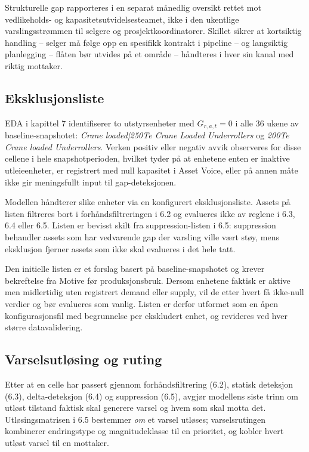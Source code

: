 \documentclass[a4paper,11pt]{article}
\begin{document}
Strukturelle gap rapporteres i en separat månedlig oversikt rettet mot vedlikeholds- og kapasitetsutvidelsesteamet, ikke i den ukentlige varslingsstrømmen til selgere og prosjektkoordinatorer. Skillet sikrer at kortsiktig handling – selger må følge opp en spesifikk kontrakt i pipeline – og langsiktig planlegging – flåten bør utvides på et område – håndteres i hver sin kanal med riktig mottaker.

\subsection{Eksklusjonsliste}

EDA i kapittel 7 identifiserer to utstyrsenheter med $G_{r,a,t} = 0$ i alle 36 ukene av baseline-snapshotet: \textit{Crane loaded|250Te Crane Loaded Underrollers} og \textit{200Te Crane loaded Underrollers}. Verken positiv eller negativ avvik observeres for disse cellene i hele snapshotperioden, hvilket tyder på at enhetene enten er inaktive utleieenheter, er registrert med null kapasitet i Asset Voice, eller på annen måte ikke gir meningsfullt input til gap-deteksjonen.

Modellen håndterer slike enheter via en konfigurert eksklusjonsliste. Assets på listen filtreres bort i forhåndsfiltreringen i 6.2 og evalueres ikke av reglene i 6.3, 6.4 eller 6.5. Listen er bevisst skilt fra suppression-listen i 6.5: suppression behandler assets som har vedvarende gap der varsling ville vært støy, mens eksklusjon fjerner assets som ikke skal evalueres i det hele tatt.

Den initielle listen er et forslag basert på baseline-snapshotet og krever bekreftelse fra Motive før produksjonsbruk. Dersom enhetene faktisk er aktive men midlertidig uten registrert demand eller supply, vil de etter hvert få ikke-null verdier og bør evalueres som vanlig. Listen er derfor utformet som en åpen konfigurasjonsfil med begrunnelse per ekskludert enhet, og revideres ved hver større datavalidering.

\subsection{Varselsutløsing og ruting}

Etter at en celle har passert gjennom forhåndsfiltrering (6.2), statisk deteksjon (6.3), delta-deteksjon (6.4) og suppression (6.5), avgjør modellens siste trinn om utløst tilstand faktisk skal generere varsel og hvem som skal motta det. Utløsingsmatrisen i 6.5 bestemmer \textit{om} et varsel utløses; varselsrutingen kombinerer endringstype og magnitudeklasse til en prioritet, og kobler hvert utløst varsel til en mottaker.
\end{document}
